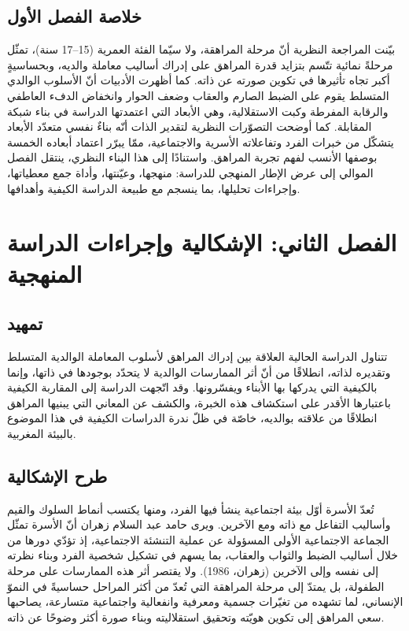 \documentclass[12pt,oneside]{report}
\begin{document}
\section*{خلاصة الفصل الأول}
بيّنت المراجعة النظرية أنّ مرحلة المراهقة، ولا سيّما الفئة العمرية (15--17 سنة)، تمثّل مرحلةً نمائية
تتّسم بتزايد قدرة المراهق على إدراك أساليب معاملة والديه، وبحساسيةٍ أكبر تجاه تأثيرها في تكوين صورته
عن ذاته. كما أظهرت الأدبيات أنّ الأسلوب الوالدي المتسلط يقوم على الضبط الصارم والعقاب وضعف
الحوار وانخفاض الدفء العاطفي والرقابة المفرطة وكبت الاستقلالية، وهي الأبعاد التي اعتمدتها الدراسة في
بناء شبكة المقابلة. كما أوضحت التصوّرات النظرية لتقدير الذات أنّه بناءٌ نفسي متعدّد الأبعاد يتشكّل من
خبرات الفرد وتفاعلاته الأسرية والاجتماعية، ممّا يبرّر اعتماد أبعاده الخمسة بوصفها الأنسب لفهم تجربة
المراهق. واستنادًا إلى هذا البناء النظري، ينتقل الفصل الموالي إلى عرض الإطار المنهجي للدراسة: منهجها،
وعيّنتها، وأداة جمع معطياتها، وإجراءات تحليلها، بما ينسجم مع طبيعة الدراسة الكيفية وأهدافها.

\chapter*{الفصل الثاني: الإشكالية وإجراءات الدراسة المنهجية}
\section*{تمهيد}
تتناول الدراسة الحالية العلاقة بين إدراك المراهق لأسلوب المعاملة الوالدية
المتسلط وتقديره لذاته، انطلاقًا من أنّ أثر الممارسات الوالدية لا يتحدّد بوجودها في ذاتها، وإنما
بالكيفية التي يدركها بها الأبناء ويفسّرونها. وقد اتّجهت الدراسة إلى المقاربة الكيفية باعتبارها
الأقدر على استكشاف هذه الخبرة، والكشف عن المعاني التي يبنيها المراهق انطلاقًا من علاقته بوالديه،
خاصّة في ظلّ ندرة الدراسات الكيفية في هذا الموضوع بالبيئة المغربية.
\section{طرح الإشكالية}
تُعدّ الأسرة أوّل بيئة اجتماعية ينشأ فيها الفرد، ومنها يكتسب أنماط السلوك والقيم وأساليب التفاعل
مع ذاته ومع الآخرين. ويرى حامد عبد السلام زهران أنّ الأسرة تمثّل الجماعة الاجتماعية الأولى المسؤولة
عن عملية التنشئة الاجتماعية، إذ تؤدّي دورها من خلال أساليب الضبط والثواب والعقاب، بما يسهم في
تشكيل شخصية الفرد وبناء نظرته إلى نفسه وإلى الآخرين (زهران، 1986). ولا يقتصر أثر هذه
الممارسات على مرحلة الطفولة، بل يمتدّ إلى مرحلة المراهقة التي تُعدّ من أكثر المراحل حساسيةً في النموّ
الإنساني، لما تشهده من تغيّرات جسمية ومعرفية وانفعالية واجتماعية متسارعة، يصاحبها سعي المراهق إلى
تكوين هويّته وتحقيق استقلاليته وبناء صورة أكثر وضوحًا عن ذاته.
\end{document}
